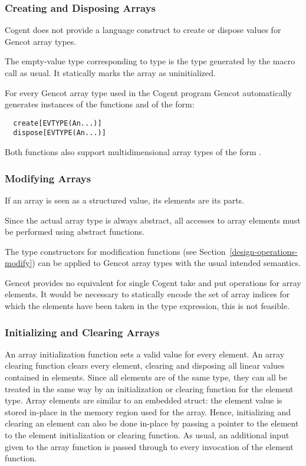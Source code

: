 \subsubsection{Creating and Disposing Arrays}

Cogent does not provide a language construct to create or dispose values for Gencot array types.

The empty-value type corresponding to type  is the type generated by the macro call  as 
usual. It statically marks the array as uninitialized.

For every Gencot array type  used in the Cogent program Gencot automatically
generates instances of the functions  and  of the form:
\begin{verbatim}
  create[EVTYPE(An...)]
  dispose[EVTYPE(An...)]
\end{verbatim}

Both functions also support multidimensional array types of the form .

\subsubsection{Modifying Arrays}

If an array is seen as a structured value, its elements are its parts.

Since the actual array type is always abstract, all accesses to array elements must be performed using abstract functions.

The type constructors for modification functions (see Section~\ref{design-operations-modify}) can be applied to 
Gencot array types with the usual intended semantics. 

Gencot provides no equivalent for single Cogent take and put operations for array elements. It would be
necessary to statically encode the set of array indices for which the elements have been taken in the type expression,
this is not feasible.

\subsubsection{Initializing and Clearing Arrays}

An array initialization function sets a valid value for every element. An array clearing function clears every element, 
clearing and disposing all linear values contained in elements. Since all elements are of the same type, they can all be
treated in the same way by an initialization or clearing function for the element type. Array elements are similar to
an embedded struct: the element value is stored in-place in the memory region used for the array. Hence, initializing and 
clearing an element can also be done in-place by passing a pointer to the element to the element initialization or 
clearing function. As usual, an additional input given to the array function is passed through to every invocation 
of the element function. 

